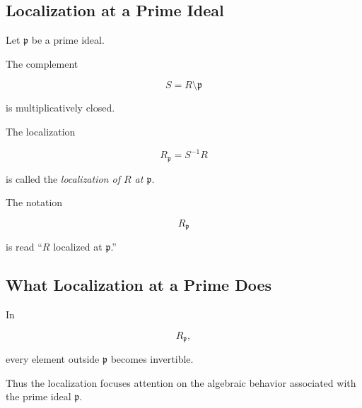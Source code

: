 \subsection{Localization at a Prime Ideal}
\label{subsec:localization-prime}

Let \(\mathfrak p\) be a prime ideal.

The complement

\[ S=R\setminus\mathfrak p \]

is multiplicatively closed.

The localization

\[ R_{\mathfrak p}=S^{-1}R \]

is called the \emph{localization of \(R\) at \(\mathfrak p\)}.

The notation

\[ R_{\mathfrak p} \]

is read ``\(R\) localized at \(\mathfrak p\).''

\subsection{What Localization at a Prime Does}
\label{subsec:meaning-localization-prime}

In

\[ R_{\mathfrak p}, \]

every element outside \(\mathfrak p\) becomes invertible.

Thus the localization focuses attention on the algebraic behavior associated
with the prime ideal \(\mathfrak p\).

\begin{center}
\end{center}

